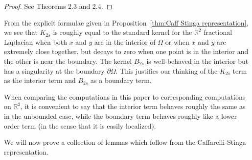 \documentclass[11pt]{amsart}
\theoremstyle{remark}
\theoremstyle{definition}
\newcommand{\R}{\mathbb{R}}
\newcommand{\del}{\partial}
\begin{document}
\begin{proof}
See \cite{CaSt} Theorems 2.3 and 2.4.  
\end{proof}

From the explicit formulae given in Proposition~\ref{thm:Caff Stinga representation}, we see that $K_{2s}$ is roughly equal to the standard kernel for the $\R^2$ fractional Laplacian when both $x$ and $y$ are in the interior of $\Omega$ or when $x$ and $y$ are extremely close together, but decays to zero when one point is in the interior and the other is near the boundary.  The kernel $B_{2s}$ is well-behaved in the interior but has a singularity at the boundary $\del \Omega$.  This justifies our thinking of the $K_{2s}$ term as the interior term and $B_{2s}$ as a boundary term.  

When comparing the computations in this paper to corresponding computations on $\R^2$, it is convenient to say that the interior term behaves roughly the same as in the unbounded case, while the boundary term behaves roughly like a lower order term (in the sense that it is easily localized).  

We will now prove a collection of lemmas which follow from the Caffarelli-Stinga representation.  
\end{document}
